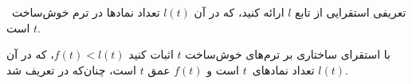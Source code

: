 \documentclass[../../../include/open-logic-section]{subfiles}
\begin{document}
\begin{prob}
  تعریفی استقرایی از تابع $l$ ارائه کنید، که در آن $l(t)$ تعداد نمادها
  در ترم خوش‌ساخت~$t$ است.
\end{prob}

\begin{prob}
  با استقرای ساختاری بر ترم‌های خوش‌ساخت $t$ اثبات کنید
  $f(t) < l(t)$، که در آن $l(t)$ تعداد نمادهای~$t$ است و $f(t)$ عمق
  $t$ است، چنان‌که در  تعریف شد.
\end{prob}
\end{document}
